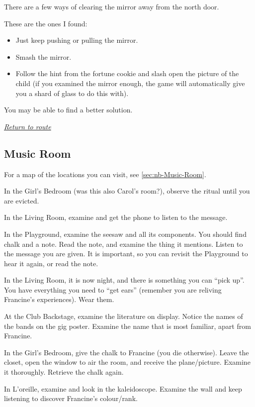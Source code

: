 \documentclass[a5paper]{extarticle}
\begin{document}
There are a few ways of clearing the mirror away from the north door.

These are the ones I found:

\begin{itemize}
\item Just keep pushing or pulling the mirror.
\item Smash the mirror.
\item Follow the hint from the fortune cookie and slash open the picture of the child (if you examined the mirror enough, the game will automatically give you a shard of glass to do this with).
\end{itemize}

You may be able to find a better solution.

\hyperref[sec:route-6]{\emph{Return to route}}

\newpage
\subsection{Music Room}\label{sec:sol-Music-Room}

For a map of the locations you can visit, see \cref{sec:nb-Music-Room}.

In the Girl's Bedroom (was this also Carol's room?),
observe the ritual until you are evicted.

In the Living Room, examine and get the phone to listen to the message.

In the Playground, examine the seesaw and all its components.
You should find chalk and a note. Read the note, and examine the thing it mentions.
Listen to the message you are given.
It is important, so you can revisit the Playground to hear it again, or read the note.

In the Living Room, it is now night, and there is something you can \enquote{pick up}.
You have everything you need to \enquote{get ears}
(remember you are reliving Francine's experiences).
Wear them.

At the Club Backstage, examine the literature on display.
Notice the names of the bands on the gig poster.
Examine the name that is most familiar, apart from Francine.

In the Girl's Bedroom, give the chalk to Francine (you die otherwise).
Leave the closet, open the window to air the room, and receive the plane\slash picture.
Examine it thoroughly. Retrieve the chalk again.

In L'oreille, examine and look in the kaleidoscope.
Examine the wall and keep listening to discover Francine's colour/rank.
\end{document}
